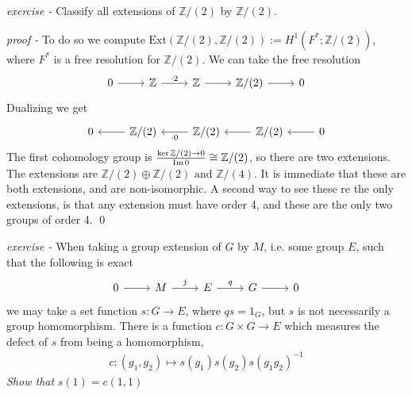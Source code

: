 \documentclass[11pt]{article}
\theoremstyle{definition}
\newcommand{\tand}{\text{ and }}
\newcommand{\im}{\text{Im\,}}
\newcommand{\ext}{\text{Ext}}
\begin{document}

    \emph{exercise - }\label{CEx10} Classify all extensions of \(\mathbb{Z}/(2)\) by \(\mathbb{Z}/(2)\).

    \emph{proof - } To do so we compute \(\ext(\mathbb{Z}/(2),\mathbb{Z}/(2)) := H^1(F^*;\mathbb{Z}/(2))\), where \(F^*\) is a free resolution for \(\mathbb{Z}/(2)\). We can take the free resolution
    \begin{equation*}
        \begin{tikzcd}
            0 \arrow[r,"{}"] & \mathbb{Z} \arrow[r,"{\cdot 2}"] & \mathbb{Z} \arrow[r,"{}"] & \mathbb{Z}/(2) \arrow[r,"{}"] & 0
        \end{tikzcd}
    \end{equation*}
    Dualizing we get
    \begin{equation*}
        \begin{tikzcd}
            0 & \mathbb{Z}/(2) \arrow[l,"{}"] & \mathbb{Z}/(2) \arrow[l,"{\cdot 0}"] & \mathbb{Z}/(2) \arrow[l,"{}"] & 0 \arrow[l,"{}"]
        \end{tikzcd}
    \end{equation*}
    The first cohomology group is \(\frac{\ker \mathbb{Z}/(2) \to 0}{\im 0} \cong \mathbb{Z}/(2)\), so there are two extensions. The extensions are
    \(\mathbb{Z}/(2) \oplus \mathbb{Z}/(2) \tand \mathbb{Z}/(4)\). It is immediate that these are both extensions, and are non-isomorphic. A second way to see these re the only extensions, is that any extension must have order 4, and these are the only two groups of order 4. \qed


    \emph{exercise - }\label{CEx11} When taking a group extension of \(G\) by \(M\), i.e. some group \(E\), such that the following is exact
    \begin{equation*}
        \begin{tikzcd}
            0 \arrow[r,"{}"] & M \arrow[r,"{j}"] & E \arrow[r,"{q}"] & G \arrow[r,"{}"] & 0
        \end{tikzcd}
    \end{equation*}
    we may take a set function \(s: G \to E\), where \(qs = 1_G\), but \(s\) is not necessarily a group homomorphism. There is a function \(c: G \times G \to E\) which measures the defect of \(s\) from being a homomorphism,
    \begin{align*}
        c:(g_1,g_2) \mapsto s(g_1)s(g_2)s(g_1g_2)^{-1}
    \end{align*}
    \emph{Show that }\(s(1) = c(1,1)\)
\end{document}
